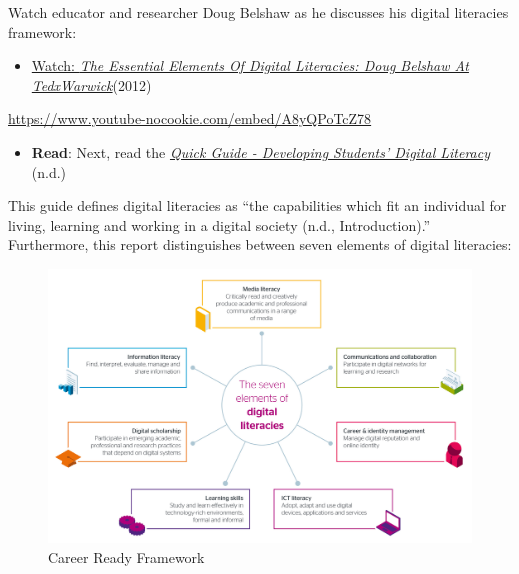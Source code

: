 \documentclass[
  letterpaper,
  DIV=11,
  numbers=noendperiod]{scrreprt}
\providecommand{\tightlist}{%
  \setlength{\itemsep}{0pt}\setlength{\parskip}{0pt}}\usepackage{longtable,booktabs,array}
\begin{document}
\begin{tcolorbox}[enhanced jigsaw, toprule=.15mm, colback=white, colframe=quarto-callout-note-color-frame, bottomtitle=1mm, leftrule=.75mm, coltitle=black, titlerule=0mm, rightrule=.15mm, colbacktitle=quarto-callout-note-color!10!white, left=2mm, title={Learning Activity}, opacitybacktitle=0.6, opacityback=0, breakable, toptitle=1mm, arc=.35mm, bottomrule=.15mm]

Watch educator and researcher Doug Belshaw as he discusses his digital
literacies framework:

\begin{itemize}
\tightlist
\item
  \href{https://www.youtube.com/watch?v=A8yQPoTcZ78}{Watch: \emph{The
  Essential Elements Of Digital Literacies: Doug Belshaw At
  TedxWarwick}}(2012)
\end{itemize}

\url{https://www.youtube-nocookie.com/embed/A8yQPoTcZ78}

\begin{itemize}
\tightlist
\item
  \textbf{Read}: Next, read the
  \href{assets/u1/JISC_REPORT_Digital_Literacies_280714_PRINT.pdf}{\emph{Quick
  Guide - Developing Students' Digital Literacy}} (n.d.)
\end{itemize}

This guide defines digital literacies as ``the capabilities which fit an
individual for living, learning and working in a digital society (n.d.,
Introduction).'' Furthermore, this report distinguishes between seven
elements of digital literacies:

\begin{figure}[H]

\caption{\label{fig-image4}Career Ready Framework}

\includegraphics{assets/u1/7-digital-literacy-elements.png}


\end{figure}
\end{tcolorbox}
\end{document}
